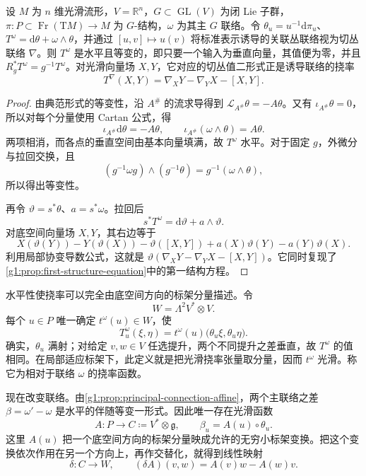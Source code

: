 \begin{proposition}
	\label{g1:prop:g-torsion-horizontal}
	设 \(M\) 为 \(n\) 维光滑流形，\(V=\mathbb R^n\)，\(G\subset\operatorname{GL}(V)\) 为闭 Lie 子群，\(\pi:P\subset\operatorname{Fr}(\mathrm TM)\to M\) 为 \(G\)-结构，\(\omega\) 为其主 \(G\) 联络。令 \(\theta_u=u^{-1}\mathrm d\pi_u\)、\(T^\omega=\mathrm d\theta+\omega\wedge\theta\)，并通过 \([u,v]\mapsto u(v)\) 将标准表示诱导的关联丛联络视为切丛联络 \(\nabla\)。则 \(T^\omega\) 是水平且等变的，即只要一个输入为垂直向量，其值便为零，并且 \(R_g^*T^\omega=g^{-1}T^\omega\)。对光滑向量场 \(X,Y\)，它对应的切丛值二形式正是诱导联络的挠率
	\[
		T^\nabla(X,Y)=\nabla_XY-\nabla_YX-[X,Y].
	\]
\end{proposition}
\begin{proof}
	由典范形式的等变性，沿 \(A^\#\) 的流求导得到 \(\mathcal L_{A^\#}\theta=-A\theta\)。又有 \(\iota_{A^\#}\theta=0\)，所以对每个分量使用 Cartan 公式，得
	\[
		\iota_{A^\#}\mathrm{d}\theta=-A\theta,
		\qquad
		\iota_{A^\#}(\omega\wedge\theta)=A\theta.
	\]
	两项相消，而各点的垂直空间由基本向量填满，故 \(T^\omega\) 水平。对于固定 \(g\)，外微分与拉回交换，且
	\[
		(g^{-1}\omega g)\wedge(g^{-1}\theta)
		=g^{-1}(\omega\wedge\theta),
	\]
	所以得出等变性。

	再令 \(\vartheta=s^*\theta\)、\(a=s^*\omega\)。拉回后
	\[
		s^*T^\omega=\mathrm{d}\vartheta+a\wedge\vartheta.
	\]
	对底空间向量场 \(X,Y\)，其右边等于
	\[
		X(\vartheta(Y))-Y(\vartheta(X))-\vartheta([X,Y])
		+a(X)\vartheta(Y)-a(Y)\vartheta(X).
	\]
	利用局部协变导数公式，这就是 \(\vartheta(\nabla_XY-\nabla_YX-[X,Y])\)。它同时复现了\cref{g1:prop:first-structure-equation}中的第一结构方程。
\end{proof}

水平性使挠率可以完全由底空间方向的标架分量描述。令
\[
	W=\Lambda^2V^*\otimes V.
\]
每个 \(u\in P\) 唯一确定 \(t^\omega(u)\in W\)，使
\begin{equation}
	\label{g1:eq:g-torsion-function}
	T^\omega_u(\xi,\eta)
	=t^\omega(u)\bigl(\theta_u\xi,\theta_u\eta\bigr).
\end{equation}
确实，\(\theta_u\) 满射；对给定 \(v,w\in V\) 任选提升，两个不同提升之差垂直，故 \(T^\omega\) 的值相同。在局部适应标架下，此定义就是把光滑挠率张量取分量，因而 \(t^\omega\) 光滑。称它为相对于联络 \(\omega\) 的挠率函数。

\ProseParagraphBreak

现在改变联络。由\cref{g1:prop:principal-connection-affine}，两个主联络之差 \(\beta=\omega'-\omega\) 是水平的伴随等变一形式。因此唯一存在光滑函数
\[
	A:P\longrightarrow C\coloneqq V^*\otimes\mathfrak g,
	\qquad \beta_u=A(u)\circ\theta_u.
\]
这里 \(A(u)\) 把一个底空间方向的标架分量映成允许的无穷小标架变换。把这个变换依次作用在另一个方向上，再作交替化，就得到线性映射
\begin{equation}
	\label{g1:eq:intrinsic-torsion-delta}
	\delta:C\longrightarrow W,\qquad
	(\delta A)(v,w)=A(v)w-A(w)v.
\end{equation}

